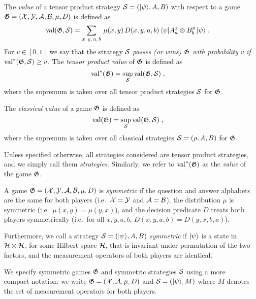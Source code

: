 \begin{definition}
  \label{definition-tensor-value}
	The \emph{value} of a tensor product strategy $\strategy =
  (\ket{\psi}, A, B)$  with respect to a game $\game=(\cal{X}, \cal{Y}, \cal{A},
  \cal{B}, \mu, D)$ is defined as
  \begin{equation*}
		\val(\game, \strategy) = \sum_{x,\, y,\, a,\, b} \, \mu(x,y)\, D(x,y,a,b)\,
    \bra{\psi} A^x_a \otimes B^y_b\, \ket{\psi}\;.
  \end{equation*}
	For $v\in[0,1]$ we say that the strategy $\strategy$ \emph{passes (or wins)
    $\game$ with probability $v$ if} $\val^*(\game, \strategy) \geq v$.
  The \emph{tensor product value} of $\game$ is defined as
  \begin{equation*}
		\val^*(\game) = \sup_\strategy \val(\game, \strategy)\;,
  \end{equation*}
	where the supremum is taken over all tensor product strategies $\strategy$ for
  $\game$.
\end{definition}

\begin{definition}
  \label{definition-classical-value}
	The \emph{classical value} of a game $\game$ is defined as
  \begin{equation*}
		\val(\game) = \sup_\strategy \val(\game, \strategy)\;,
  \end{equation*}
	where the supremum is taken over all classical strategies $\strategy = (\rho,A,B)$ for
  $\game$.
\end{definition}


\begin{remark}
  Unless specified otherwise, all strategies considered  are tensor
  product strategies, and we simply call them \emph{strategies}.
  Similarly, we refer to $\val^*(\game)$ as the \emph{value} of the game
  $\game$.
\end{remark}



\begin{definition}
  \label{definition-symmetric-games}
	A game $\game = (\cal{X}, \cal{Y}, \cal{A}, \cal{B}, \mu, D)$ is
  \emph{symmetric} if the question and answer alphabets are the same for both
  players (i.e.\
  $\cal{X} = \cal{Y}$ and $\cal{A} = \cal{B}$), the distribution $\mu$ is
  symmetric (i.e.\
  $\mu(x,y) = \mu(y,x)$), and the decision predicate $D$ treats both players
  symmetrically (i.e.\ for all $x,y,a,b$, $D(x,y,a,b) = D(y,x,b,a)$).
	
  Furthermore, we call a strategy $\strategy = (\ket{\psi}, A, B)$
  \emph{symmetric} if $\ket{\psi}$ is a state in $\mH \otimes \mH$, for some
  Hilbert space $\mH$, that is invariant under permutation of the two factors,
  and the measurement operators of both players are identical.
	
  We specify symmetric games $\game$ and symmetric strategies $\strategy$ using
  a more compact notation: we write $\game = (\cal{X}, \cal{A}, \mu, D)$ and
  $\strategy = (\ket{\psi}, M)$ where $M$ denotes the set of measurement
  operators for both players.
\end{definition}

